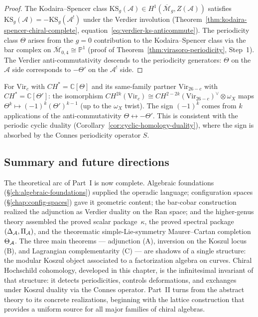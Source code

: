 \begin{proof}
The Kodaira--Spencer class $\mathrm{KS}_g(\mathcal{A}) \in H^1(\overline{\mathcal{M}}_g, Z(\mathcal{A}))$ satisfies $\mathrm{KS}_g(\mathcal{A}) = -\mathrm{KS}_g(\mathcal{A}^!)$ under the Verdier involution (Theorem~\ref{thm:kodaira-spencer-chiral-complete}, equation~\eqref{eq:verdier-ks-anticommute}).  The periodicity class $\Theta$ arises from the $g = 0$ contribution to the Kodaira--Spencer class via the bar complex on $\overline{\mathcal{M}}_{0,4} \cong \mathbb{P}^1$ (proof of Theorem~\ref{thm:virasoro-periodicity}, Step~1).  The Verdier anti-commutativity descends to the periodicity generators: $\Theta$ on the $\mathcal{A}$ side corresponds to $-\Theta'$ on the $\mathcal{A}^!$ side.
\end{proof}

\begin{remark}\label{rem:cup-exchange-virasoro}
For $\mathrm{Vir}_c$ with $CH^* = \mathbb{C}[\Theta]$ and its
same-family partner $\mathrm{Vir}_{26-c}$ with $CH^* =
\mathbb{C}[\Theta']$: the isomorphism
$CH^{2k}(\mathrm{Vir}_c) \cong CH^{2-2k}(\mathrm{Vir}_{26-c})^\vee
\otimes \omega_X$ maps $\Theta^k \mapsto (-1)^k (\Theta')^{k-1}$ (up
to the $\omega_X$ twist).  The sign $(-1)^k$ comes from $k$
applications of the anti-commutativity $\Theta \leftrightarrow
-\Theta'$.  This is consistent with the periodic cyclic duality
(Corollary~\ref{cor:cyclic-homology-duality}), where the sign is
absorbed by the Connes periodicity operator $S$.
\end{remark}

\subsection{Summary and future directions}

The theoretical arc of Part~I is now complete.  Algebraic foundations (\S\ref{ch:algebraic-foundations}) supplied the operadic language; configuration spaces (\S\ref{chap:config-spaces}) gave it geometric content; the bar-cobar construction realized the adjunction as Verdier duality on the Ran space; and the higher-genus theory assembled the proved scalar package~$\kappa$, the proved spectral package~$(\Delta_{\mathcal{A}},\Pi_{\mathcal{A}})$, and the theorematic simple-Lie-symmetry Maurer--Cartan completion~$\Theta_{\mathcal{A}}$.  The three main theorems --- adjunction (A), inversion on the Koszul locus (B), and Lagrangian complementarity (C) --- are shadows of a single structure: the modular Koszul object associated to a factorization algebra on curves.  Chiral Hochschild cohomology, developed in this chapter, is the infinitesimal invariant of that structure: it detects periodicities, controls deformations, and exchanges under Koszul duality via the Connes operator.  Part~II turns from the abstract theory to its concrete realizations, beginning with the lattice construction that provides a uniform source for all major families of chiral algebras.
